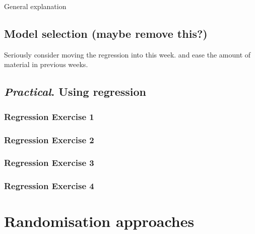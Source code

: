 \documentclass[
]{book}
\begin{document}
General explanation

\hypertarget{model-selection-maybe-remove-this}{%
\chapter{Model selection (maybe remove this?)}\label{model-selection-maybe-remove-this}}

Seriously consider moving the regression into this week. and ease the amount of material in previous weeks.

\hypertarget{practical.-using-regression}{%
\chapter{\texorpdfstring{\emph{Practical}. Using regression}{Practical. Using regression}}\label{practical.-using-regression}}

\hypertarget{regression-exercise-1}{%
\section{Regression Exercise 1}\label{regression-exercise-1}}

\hypertarget{regression-exercise-2}{%
\section{Regression Exercise 2}\label{regression-exercise-2}}

\hypertarget{regression-exercise-3}{%
\section{Regression Exercise 3}\label{regression-exercise-3}}

\hypertarget{regression-exercise-4}{%
\section{Regression Exercise 4}\label{regression-exercise-4}}

\hypertarget{part-randomisation-approaches}{%
\part{Randomisation approaches}\label{part-randomisation-approaches}}
\end{document}
